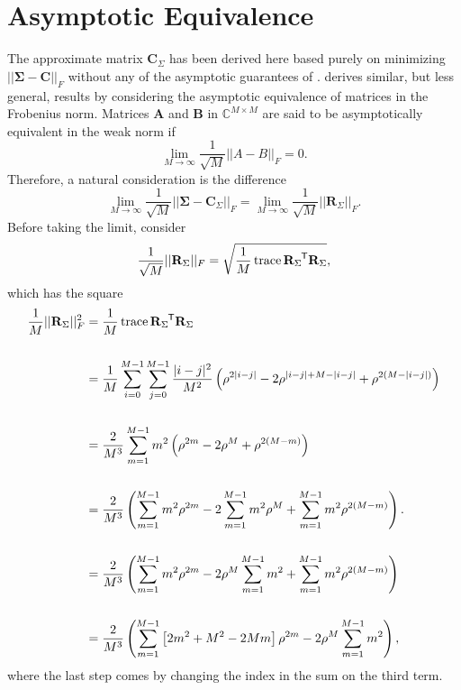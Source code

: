 \documentclass[letterpaper,12pt,oneside,final]{article}
\newcommand{\m}[1]{\mathbf{#1}}               %
\newcommand{\sm}[1]{\boldsymbol{#1}}   %
\newcommand{\tr}[1]{{#1}^{\mkern-1.5mu\mathsf{T}}}              %
\newcommand{\norm}[1]{||{#1}||}              %
\newcommand{\frob}[1]{\norm{#1}_F}
\newcommand{\abs}[1]{\lvert{#1}\rvert}              %
\newcommand*{\trace}{\operatorname{trace}}
\newcommand{\field}[1]{\mathbb{#1}}
\newcommand{\Complex}{\field{C}}
\begin{document}
\section{Asymptotic Equivalence} \label{c:multipleTesting:asympEquiv}

The approximate matrix $\m{C}_{\Sigma}$ has been derived here based purely on minimizing $\frob{\sm{\Sigma} - \m{C}}$ without any of the asymptotic guarantees of \cite{grenanderszego1958}. \cite{gray2006toeplitz} derives similar, but less general, results by considering the asymptotic equivalence of matrices in the Frobenius norm. Matrices $\m{A}$ and $\m{B}$ in $\Complex^{M \times M}$ are said to be asymptotically equivalent in the weak norm if
$$\lim_{M \rightarrow \infty} \frac{1}{\sqrt{M}} \frob{A - B} = 0.$$
Therefore, a natural consideration is the difference
\begin{equation} \label{eq:multipleTesting:asympEq}
  \lim_{M \rightarrow \infty} \frac{1}{\sqrt{M}} \frob{\sm{\Sigma} - \m{C}_{\Sigma}} = \lim_{M \rightarrow \infty} \frac{1}{\sqrt{M}} \frob{\m{R}_{\Sigma}}.
\end{equation}
Before taking the limit, consider
$$\frac{1}{\sqrt{M}} \frob{\m{R}_{\Sigma}} =  \sqrt{ \frac{1}{M} \trace{\tr{\m{R}_{\Sigma}} \m{R}_{\Sigma}} },$$
which has the square
\begin{equation} \label{eq:multipleTesting:asymTrace}
  \begin{aligned}
    \frac{1}{M} \frob{\m{R}_{\Sigma}}^2 & =  \frac{1}{M} \trace{\tr{\m{R}_{\Sigma}} \m{R}_{\Sigma}} \\
    & \\
    & = \frac{1}{M} \sum_{i = 0}^{M-1} \sum_{j = 0}^{M-1} \frac{\abs{i-j}^2}{M^2} \left ( \rho^{2\abs{i-j}} - 2 \rho^{\abs{i-j} + M - \abs{i-j}} + \rho^{2(M - \abs{i-j})} \right ) \\
    & \\
    & =  \frac{2}{M^3} \sum_{m = 1}^{M-1} m^2 \left ( \rho^{2m} - 2 \rho^{M} + \rho^{2(M - m)} \right ) \\
    & \\
    & =  \frac{2}{M^3} \left ( \sum_{m = 1}^{M-1} m^2 \rho^{2m} - 2 \sum_{m = 1}^{M-1} m^2 \rho^M + \sum_{m = 1}^{M-1} m^2 \rho^{2(M-m)} \right ). \\
    & \\
    & = \frac{2}{M^3} \left ( \sum_{m = 1}^{M-1} m^2 \rho^{2m} - 2\rho^M \sum_{m = 1}^{M-1} m^2 + \sum_{m = 1}^{M-1} m^2 \rho^{2(M-m)} \right ) \\
    & \\
    & =  \frac{2}{M^3} \left ( \sum_{m = 1}^{M-1} \left [ 2m^2 + M^2 - 2Mm \right ] \rho^{2m} -  2 \rho^M \sum_{m = 1}^{M-1} m^2 \right ),
  \end{aligned}
\end{equation}
where the last step comes by changing the index in the sum on the third term.
\end{document}
